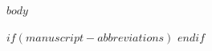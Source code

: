 \documentclass[%
  $for(classoption)$$classoption$,$endfor$%
  jpm,%
  $if(articletype)$$articletype$$else$article$endif$,%
  submit,%
  moreauthors%
]{Definitions/mdpi}
\begin{document}
$body$

$if(manuscript-abbreviations)$
$endif$


\end{document}
